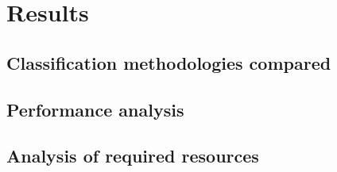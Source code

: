 \chapter{Results}
\section{Classification methodologies compared}
\section{Performance analysis}
\section{Analysis of required resources}